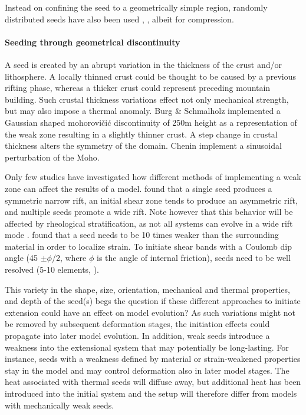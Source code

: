 Instead on confining the seed to a geometrically simple region, randomly distributed seeds 
have also been used \cite{thie11}, \cite{thsh14}, albeit for compression. 

\paragraph{Seeding through geometrical discontinuity} 
A seed is created by an abrupt variation in the thickness of the crust and/or lithosphere.
A locally thinned crust could be thought to be caused by a previous rifting phase,
whereas a thicker crust could represent preceding mountain building.
Such crustal thickness variations effect not only mechanical strength, but may also
impose a thermal anomaly.
Burg \& Schmalholz \cite{busc08} implemented a Gaussian shaped mohorovi\v{c}i\'c discontinuity of 250m 
height as a representation of the weak zone resulting in a slightly thinner crust.
A step change in crustal thickness alters the symmetry of the domain. 
Chenin \etal \cite{chsm20} implement a sinusoidal perturbation of the Moho.


Only few studies have investigated how different methods of implementing a weak zone 
can affect the results of a model. 
\cite{dyrm07} found that a single seed produces a symmetric narrow rift, an initial shear
zone tends to produce an asymmetric rift, and multiple seeds promote a wide rift. 
Note however that this behavior will be affected by rheological stratification, as not
all systems can evolve in a wide rift mode \cite{hubb05,buhb08}.
\cite{dyrm07} found that a seed needs to be 10 times weaker than 
the surrounding material in order to localize strain. 
To initiate shear bands with a Coulomb dip angle (45 $\pm\phi$/2, where $\phi$ is the
angle of internal friction), seeds need to be well resolved (5-10 elements, \cite{kaus10}). 

This variety in the shape, size, orientation, mechanical and thermal properties, 
and depth of the seed(s) begs the question if these different approaches to
initiate extension could have an effect on model evolution? 
As such variations might not be
removed by subsequent deformation stages, the initiation effects could propagate into
later model evolution. 
In addition, weak seeds introduce a weakness into the extensional system that may 
potentially be long-lasting. 
For instance, seeds with a weakness defined by material or strain-weakened properties 
stay in the model and may control deformation also in later model stages. 
The heat associated with thermal seeds will diffuse away, but additional 
heat has been introduced into the initial system and the setup will therefore differ from 
models with mechanically weak seeds. 

